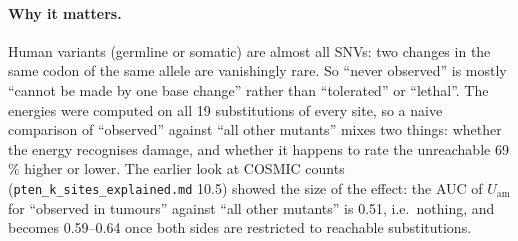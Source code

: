 \documentclass[11pt,a4paper]{article}
\newcommand{\file}[1]{\texttt{#1}}
\newcommand{\Uam}{U_{\mathrm{am}}}
\begin{document}
\paragraph{Why it matters.} Human variants (germline or somatic) are almost
all SNVs: two changes in the same codon of the same allele are vanishingly
rare. So ``never observed'' is mostly ``cannot be made by one base change''
rather than ``tolerated'' or ``lethal''. The energies were computed on all 19
substitutions of every site, so a naive comparison of ``observed'' against
``all other mutants'' mixes two things: whether the energy recognises damage,
and whether it happens to rate the unreachable 69\,\% higher or lower. The
earlier look at COSMIC counts (\file{pten\_k\_sites\_explained.md} 10.5) showed
the size of the effect: the AUC of $\Uam$ for ``observed in tumours'' against
``all other mutants'' is 0.51, i.e.\ nothing, and becomes 0.59--0.64 once both
sides are restricted to reachable substitutions.
\end{document}
